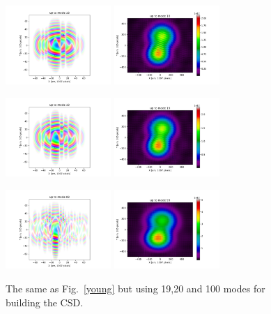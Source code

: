 \documentclass{iucr}              %
\newcommand{\inblue}[1]{{\color{blue}#1}}
\begin{document}
\begin{figure}
\caption{The same as \inblue{Fig.~\ref{young}} but using 19,20 and 100 modes for building the CSD.}


\includegraphics[width=4cm]{Figures/interference_D_uptomode0018_csd.png}
\includegraphics[width=4cm]{Figures/interference_D_uptomode0018_pattern.png}

\includegraphics[width=4cm]{Figures/interference_D_uptomode0019_csd.png}
\includegraphics[width=4cm]{Figures/interference_D_uptomode0019_pattern.png}

\includegraphics[width=4cm]{Figures/interference_D_uptomode0099_csd.png}
\includegraphics[width=4cm]{Figures/interference_D_uptomode0099_pattern.png}

\label{young2}
\end{figure}
\end{document}
